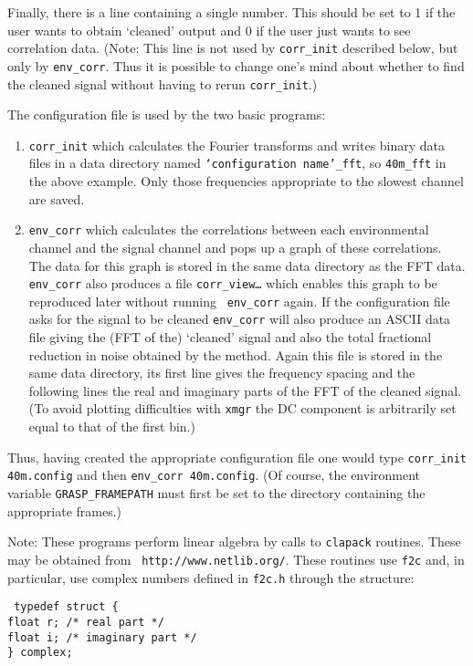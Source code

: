 \noindent Finally, there is a line containing a single number.  This should be
set to 1 if the user wants to obtain `cleaned' output and 0 if the
user just wants to see correlation data.  (Note: This line is not used by
{\tt corr\_init} described below, but only by {\tt env\_corr}.  Thus it
is possible to change one's mind about whether to find the cleaned 
signal without having to rerun {\tt corr\_init}.)

The configuration file is used by the two basic programs:
\begin{enumerate}
\item {\tt  corr\_init} which calculates the Fourier transforms and writes 
binary data files in a data directory named {\tt `configuration name'\_fft}, so
{\tt 40m\_fft} in the above example. Only those frequencies
appropriate to the slowest channel are saved.
\item {\tt env\_corr} which calculates the correlations between each
environmental channel and the signal channel and pops up a graph 
of these correlations.  
The data for this graph is stored in the same data directory as the
FFT data.  {\tt env\_corr} also produces a file {\tt corr\_view\dots}
which enables this graph to be reproduced later without running  {\tt
  env\_corr} again.  If the configuration file asks for the
signal to be cleaned {\tt env\_corr} will also produce an ASCII data file
giving the (FFT of the) `cleaned' signal and also the total fractional reduction 
in noise obtained by the method. 
Again this file is stored in the same data directory, its first line
gives the frequency spacing and the following lines the real and
imaginary parts of the FFT of the cleaned signal.  (To avoid plotting
difficulties with {\tt xmgr} the DC component is arbitrarily set equal
to that of the first bin.)  
\end{enumerate}

Thus, having created the appropriate configuration file one would
type {\tt corr\_init  40m.config} and then {\tt env\_corr 40m.config}.
(Of course, the environment variable {\tt GRASP\_FRAMEPATH} must first
be set to the directory containing the appropriate frames.)

\begin{description}
\item{Note:} These programs perform linear algebra by calls to 
{\tt clapack} routines.  These may be obtained from {\tt
  http://www.netlib.org/}.  These routines use {\tt f2c} 
and, in particular, use complex numbers defined
in {\tt f2c.h} through the structure:

{\tt 
typedef struct \{\\
  float r;  /* real part */\\
  float i;  /* imaginary part */\\
\} complex;}

\end{description}

